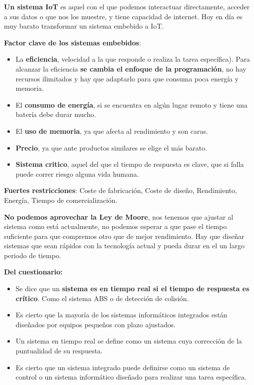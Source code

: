 \documentclass[12pt]{report} %
\begin{document}
\textbf{Un sistema IoT} es aquel con el que podemos interactuar
directamente, acceder a sus datos o que nos los muestre, y tiene
capacidad de internet. Hoy en día es muy barato transformar un sistema
embebido a IoT.

\textbf{Factor clave de los sistemas embebidos}:

\begin{itemize}

\item
  La \textbf{eficiencia}, velocidad a la que responde o realiza la tarea
  específica). Para alcanzar la eficiencia \textbf{se cambia el enfoque
  de la programación}, no hay recursos ilimitados y hay que adaptarlo
  para que consuma poca energía y memoria.
\item
  El \textbf{consumo de energía}, si se encuentra en algún lugar remoto
  y tiene una batería debe durar mucho.
\item
  El \textbf{uso de memoria}, ya que afecta al rendimiento y son caras.
\item
  \textbf{Precio}, ya que ante productos similares se elige el más
  barato.
\item
  \textbf{Sistema critico}, aquel del que el tiempo de respuesta es
  clave, que si falla puede correr riesgo alguna vida humana.
\end{itemize}

\textbf{Fuertes restricciones}: Coste de fabricación, Coste de diseño, Rendimiento, Energía, Tiempo de comercialización.

\textbf{No podemos aprovechar la Ley de Moore}, nos tenemos que ajustar
al sistema como está actualmente, no podemos esperar a que pase el
tiempo suficiente para que compremos otro que de mejor rendimiento. Hay
que diseñar sistemas que sean rápidos con la tecnología actual y pueda
durar en el un largo periodo de tiempo.

\textbf{Del cuestionario:}

\begin{itemize}

\item
  Se dice que un \textbf{sistema es en tiempo real si el tiempo de
  respuesta es crítico}. Como el sistema ABS o de detección de colisión.
\item
  Es cierto que la mayoría de los sistemas informáticos integrados están
  diseñados por equipos pequeños con plazo ajustados.
\item
  Un sistema en tiempo real se define como un sistema cuya corrección de
  la puntualidad de su respuesta.
\item
  Es cierto que un sistema integrado puede definirse como un sistema de
  control o un sistema informático diseñado para realizar una tarea
  específica.
\end{itemize}
\end{document}
